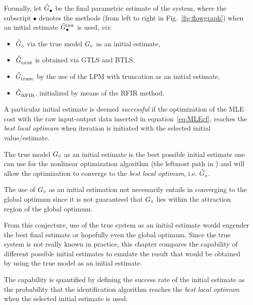 Formally, let $\model{\bullet}$ be the final parametric estimate of the system, where the subscript $\bullet$ denotes the methods (from left to right in Fig.~\ref{fig:flowgraph}) when an initial estimate $\model[init]{\bullet}$ is used, \emph{viz}:
\begin{itemize}
\item 
$\model{\trueSymbol}$ via the true model $\true{G}$ as an initial estimate,
\item
$\model{exist}$ is obtained via GTLS and BTLS,
\item
$\model{trunc}$ by the use of the LPM with truncation as an initial estimate,
\item
$\model{RFIR}$, initialized by means of the RFIR method. 
\end{itemize} 

A particular initial estimate is deemed \emph{successful} if the optimization of the MLE cost with the raw input-output data inserted in equation~\eqref{eq:MLEcf}, reaches the \emph{best local optimum} when iteration is initiated with the selected initial value/estimate.

\begin{conjecture}\label{conj1}
The true model $\true{G}$ as an initial estimate is the best possible initial estimate one can use for the nonlinear optimization algorithm (the leftmost path in ) and will allow the optimization to converge to the \emph{best local optimum}, i.e. $\model{\trueSymbol}$.
\end{conjecture}
\begin{remark}
The use of $\true{G}$ as an initial estimation not necessarily entails in converging to the global optimum since it is not guaranteed that $\true{G}$ lies within the attraction region of the global optimum.
\end{remark}

From this conjecture, use of the true system as an initial estimate would engender the best final estimate or hopefully even the global optimum.
Since the true system is not really known in practice, this chapter compares the capability of different possible initial estimates to emulate the result that would be obtained by using the true model as an initial estimate. 

The capability is quantified by defining the success rate of the initial estimate as the probability that the identification algorithm reaches the \emph{best local optimum} when the selected initial estimate is used. %



